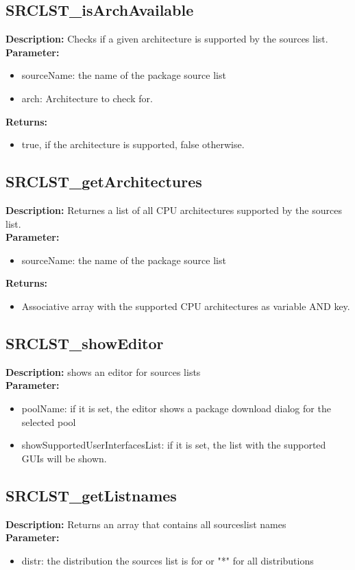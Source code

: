 \subsection{SRCLST\_isArchAvailable}
\textbf{Description:} Checks if a given architecture is supported by the sources list.\\
\textbf{Parameter:}
\begin{itemize}
\item sourceName: the name of the package source list
\item arch: Architecture to check for.
\end{itemize}
\textbf{Returns:}
\begin{itemize}
\item true, if the architecture is supported, false otherwise.
\end{itemize}

\subsection{SRCLST\_getArchitectures}
\textbf{Description:} Returnes a list of all CPU architectures supported by the sources list.\\
\textbf{Parameter:}
\begin{itemize}
\item sourceName: the name of the package source list
\end{itemize}
\textbf{Returns:}
\begin{itemize}
\item Associative array with the supported CPU architectures as variable AND key.
\end{itemize}

\subsection{SRCLST\_showEditor}
\textbf{Description:} shows an editor for sources lists\\
\textbf{Parameter:}
\begin{itemize}
\item poolName: if it is set, the editor shows a package download dialog for the selected pool
\item showSupportedUserInterfacesList: if it is set, the list with the supported GUIs will be shown.
\end{itemize}

\subsection{SRCLST\_getListnames}
\textbf{Description:} Returns an array that contains all sourceslist names\\
\textbf{Parameter:}
\begin{itemize}
\item distr: the distribution the sources list is for or "*" for all distributions
\end{itemize}


